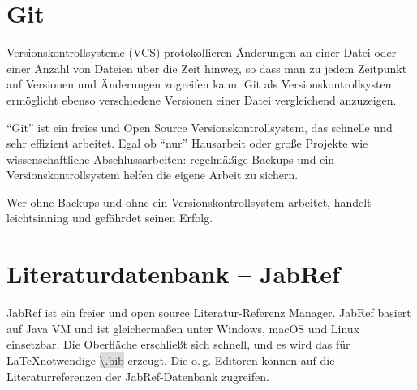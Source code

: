 \documentclass[12pt,	%
				headings=small,		%
				toc=bibliography,	%
			]	%
{scrreprt}		%
\newcommand{\inlinecode}[1]{\colorbox{Gainsboro}{\textsf{\textbackslash#1}}} %
\begin{document}
\section{Git}
\label{Git}
Versionskontrollsysteme (VCS) protokollieren Änderungen an einer Datei oder einer Anzahl von Dateien über die Zeit hinweg, so dass man zu jedem Zeitpunkt auf Versionen und Änderungen zugreifen kann. Git als Versionskontrollsystem ermöglicht ebenso verschiedene Versionen einer Datei vergleichend anzuzeigen.

\enquote{Git} ist ein freies und Open Source Versionskontrollsystem, das schnelle und sehr effizient arbeitet.\autocite{ProGit} Egal ob \enquote{nur} Hausarbeit oder große Projekte wie wissenschaftliche Abschlussarbeiten: regelmäßige Backups und ein Versionskontrollsystem helfen die eigene Arbeit zu sichern. 

Wer ohne Backups und ohne ein Versionskontrollsystem arbeitet, handelt leichtsinning und gefährdet seinen Erfolg.


\section{Literaturdatenbank – JabRef}
\label{JabRef}
JabRef ist ein freier und  open source Literatur-Referenz Manager. JabRef basiert auf Java VM und ist gleichermaßen unter Windows, macOS und Linux einsetzbar. Die Oberfläche erschließt sich schnell, und es wird das für \LaTeX notwendige \inlinecode{*.bib} erzeugt. Die o.\,g. Editoren können auf die Literaturreferenzen der JabRef-Datenbank zugreifen.\autocite{JabRef}






\printbibliography[title={Literaturverzeichnis und Web-Links}]	%
	
\end{document}
